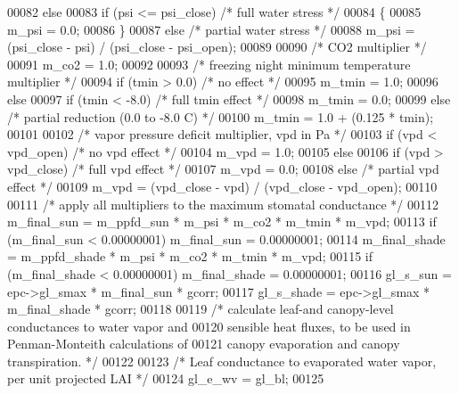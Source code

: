 \begin{DoxyCode}
00082     \textcolor{keywordflow}{else}
00083     \textcolor{keywordflow}{if} (psi <= psi\_close)   \textcolor{comment}{/* full water stress */}
00084     \{
00085         m\_psi = 0.0;      
00086     \}
00087     \textcolor{keywordflow}{else}                   \textcolor{comment}{/* partial water stress */}
00088         m\_psi = (psi\_close - psi) / (psi\_close - psi\_open);
00089 
00090     \textcolor{comment}{/* CO2 multiplier */}
00091     m\_co2 = 1.0;
00092 
00093     \textcolor{comment}{/* freezing night minimum temperature multiplier */}
00094     \textcolor{keywordflow}{if} (tmin > 0.0)        \textcolor{comment}{/* no effect */}
00095         m\_tmin = 1.0;
00096     \textcolor{keywordflow}{else}
00097     \textcolor{keywordflow}{if} (tmin < -8.0)       \textcolor{comment}{/* full tmin effect */}
00098         m\_tmin = 0.0;
00099     \textcolor{keywordflow}{else}                   \textcolor{comment}{/* partial reduction (0.0 to -8.0 C) */}
00100         m\_tmin = 1.0 + (0.125 * tmin);
00101     
00102     \textcolor{comment}{/* vapor pressure deficit multiplier, vpd in Pa */}
00103     \textcolor{keywordflow}{if} (vpd < vpd\_open)    \textcolor{comment}{/* no vpd effect */}
00104         m\_vpd = 1.0;
00105     \textcolor{keywordflow}{else}
00106     \textcolor{keywordflow}{if} (vpd > vpd\_close)   \textcolor{comment}{/* full vpd effect */}
00107         m\_vpd = 0.0;
00108     \textcolor{keywordflow}{else}                   \textcolor{comment}{/* partial vpd effect */}
00109         m\_vpd = (vpd\_close - vpd) / (vpd\_close - vpd\_open);
00110 
00111     \textcolor{comment}{/* apply all multipliers to the maximum stomatal conductance */}
00112     m\_final\_sun = m\_ppfd\_sun * m\_psi * m\_co2 * m\_tmin * m\_vpd;
00113     \textcolor{keywordflow}{if} (m\_final\_sun < 0.00000001) m\_final\_sun = 0.00000001;
00114     m\_final\_shade = m\_ppfd\_shade * m\_psi * m\_co2 * m\_tmin * m\_vpd;
00115     \textcolor{keywordflow}{if} (m\_final\_shade < 0.00000001) m\_final\_shade = 0.00000001;
00116     gl\_s\_sun = epc->gl\_smax * m\_final\_sun * gcorr;
00117     gl\_s\_shade = epc->gl\_smax * m\_final\_shade * gcorr;
00118     
00119     \textcolor{comment}{/* calculate leaf-and canopy-level conductances to water vapor and}
00120 \textcolor{comment}{    sensible heat fluxes, to be used in Penman-Monteith calculations of}
00121 \textcolor{comment}{    canopy evaporation and canopy transpiration. */}
00122     
00123     \textcolor{comment}{/* Leaf conductance to evaporated water vapor, per unit projected LAI */}
00124     gl\_e\_wv = gl\_bl;
00125         

\end{DoxyCode}
